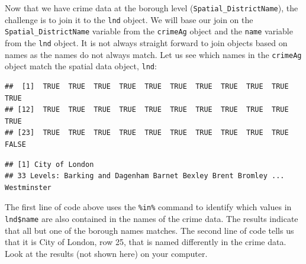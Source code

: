 \documentclass[]{article}
\newenvironment{Shaded}{}{}
\newcommand{\KeywordTok}[1]{\textcolor[rgb]{0.00,0.44,0.13}{\textbf{{#1}}}}
\newcommand{\StringTok}[1]{\textcolor[rgb]{0.25,0.44,0.63}{{#1}}}
\newcommand{\CommentTok}[1]{\textcolor[rgb]{0.38,0.63,0.69}{\textit{{#1}}}}
\newcommand{\NormalTok}[1]{{#1}}
\begin{document}
Now that we have crime data at the borough level
(\texttt{Spatial\_DistrictName}), the challenge is to join it to the
\texttt{lnd} object. We will base our join on the
\texttt{Spatial\_DistrictName} variable from the \texttt{crimeAg} object
and the \texttt{name} variable from the \texttt{lnd} object. It is not
always straight forward to join objects based on names as the names do
not always match. Let us see which names in the \texttt{crimeAg} object
match the spatial data object, \texttt{lnd}:

\begin{Shaded}
\end{Shaded}

\begin{verbatim}
##  [1]  TRUE  TRUE  TRUE  TRUE  TRUE  TRUE  TRUE  TRUE  TRUE  TRUE  TRUE
## [12]  TRUE  TRUE  TRUE  TRUE  TRUE  TRUE  TRUE  TRUE  TRUE  TRUE  TRUE
## [23]  TRUE  TRUE  TRUE  TRUE  TRUE  TRUE  TRUE  TRUE  TRUE  TRUE FALSE
\end{verbatim}

\begin{Shaded}
\end{Shaded}

\begin{verbatim}
## [1] City of London
## 33 Levels: Barking and Dagenham Barnet Bexley Brent Bromley ... Westminster
\end{verbatim}

The first line of code above uses the \texttt{\%in\%} command to
identify which values in \texttt{lnd\$name} are also contained in the
names of the crime data. The results indicate that all but one of the
borough names matches. The second line of code tells us that it is City
of London, row 25, that is named differently in the crime data. Look at
the results (not shown here) on your computer.

\begin{Shaded}
\end{Shaded}
\end{document}
